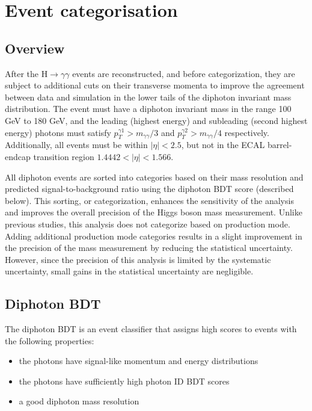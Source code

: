 \chapter{Event categorisation}
\label{chap:categorisation}

\section{Overview}

After the H$\rightarrow\gamma\gamma$ events are reconstructed, and before categorization, they are subject to additional cuts on their transverse momenta to improve the agreement between data and simulation in the lower tails of the diphoton invariant mass distribution. The event must have a diphoton invariant mass in the range 100 GeV to 180 GeV, and the leading (highest energy) and subleading (second highest energy) photons must satisfy $p_T^{\gamma 1} > m_{\gamma\gamma}/3$ and $p_T^{\gamma 2} > m_{\gamma\gamma}/4$ respectively. Additionally, all events must be within $|\eta| < 2.5$, but not in the ECAL barrel-endcap transition region $1.4442 < |\eta| < 1.566$. 

All diphoton events are sorted into categories based on their mass resolution and predicted signal-to-background ratio using the diphoton BDT score (described below). This sorting, or categorization, enhances the sensitivity of the analysis and improves the overall precision of the Higgs boson mass measurement. Unlike previous studies, this analysis does not categorize based on production mode. Adding additional production mode categories results in a slight improvement in the precision of the mass measurement by reducing the statistical uncertainty. However, since the precision of this analysis is limited by the systematic uncertainty, small gains in the statistical uncertainty are negligible.


\section{Diphoton BDT}

The diphoton BDT is an event classifier that assigns high scores to events with the following properties:
\begin{itemize}
    \item the photons have signal-like momentum and energy distributions
    \item the photons have sufficiently high photon ID BDT scores
    \item a good diphoton mass resolution
\end{itemize}

